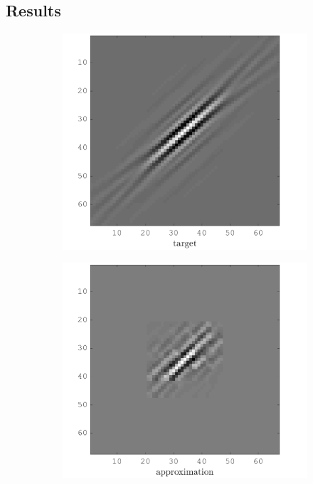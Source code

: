 \subsection{Results}
\begin{figure}[!h]\centering
    \begin{subfigure}[b]{0.49\textwidth}\centering
    \includegraphics[width=\textwidth]{figures/xp/xp_128x128_sc2_angl1_K3_S3_node2_target.png}
    \end{subfigure}
\begin{subfigure}[b]{0.49\textwidth}\centering
\includegraphics[width=\textwidth]{figures/xp/xp_128x128_sc2_angl1_K3_S3_node2_approx.png}

\end{subfigure}
\end{figure}
